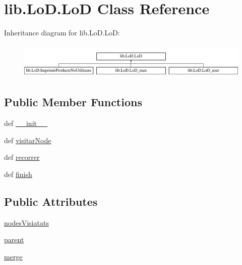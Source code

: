 \hypertarget{classlib_1_1_lo_d_1_1_lo_d}{\section{lib.\-Lo\-D.\-Lo\-D Class Reference}
\label{classlib_1_1_lo_d_1_1_lo_d}
}
Inheritance diagram for lib.\-Lo\-D.\-Lo\-D\-:\begin{figure}[H]
\begin{center}
\leavevmode
\includegraphics[height=1.704718cm]{classlib_1_1_lo_d_1_1_lo_d}
\end{center}
\end{figure}
\subsection*{Public Member Functions}
\begin{DoxyCompactItemize}
\item 
def \hyperlink{classlib_1_1_lo_d_1_1_lo_d_aa7c946c2f2788a48905d2109f77de9bf}{\-\_\-\-\_\-init\-\_\-\-\_\-}
\item 
def \hyperlink{classlib_1_1_lo_d_1_1_lo_d_a0b619948e1ef77b84a10fe5cba4e36cc}{visitar\-Node}
\item 
def \hyperlink{classlib_1_1_lo_d_1_1_lo_d_a3c9b80db14ddae8b056102cefba81d5e}{recorrer}
\item 
def \hyperlink{classlib_1_1_lo_d_1_1_lo_d_a121e761f97ac602350b8e72eb2e8317e}{finish}
\end{DoxyCompactItemize}
\subsection*{Public Attributes}
\begin{DoxyCompactItemize}
\item 
\hyperlink{classlib_1_1_lo_d_1_1_lo_d_ae9ac9b8c5a1b8c66518f1681bff48078}{nodes\-Visiatats}
\item 
\hyperlink{classlib_1_1_lo_d_1_1_lo_d_a19c56f06f44d2285fbfc8fa6e69bff6b}{parent}
\item 
\hyperlink{classlib_1_1_lo_d_1_1_lo_d_a9d7425cf14f1f5b52625b8b6e924214e}{merge}
\end{DoxyCompactItemize}


